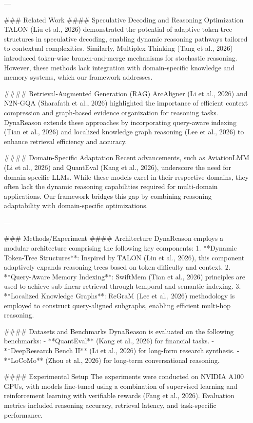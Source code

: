 ---

### Related Work  
#### Speculative Decoding and Reasoning Optimization  
TALON (Liu et al., 2026) demonstrated the potential of adaptive token-tree structures in speculative decoding, enabling dynamic reasoning pathways tailored to contextual complexities. Similarly, Multiplex Thinking (Tang et al., 2026) introduced token-wise branch-and-merge mechanisms for stochastic reasoning. However, these methods lack integration with domain-specific knowledge and memory systems, which our framework addresses.

#### Retrieval-Augmented Generation (RAG)  
ArcAligner (Li et al., 2026) and N2N-GQA (Sharafath et al., 2026) highlighted the importance of efficient context compression and graph-based evidence organization for reasoning tasks. DynaReason extends these approaches by incorporating query-aware indexing (Tian et al., 2026) and localized knowledge graph reasoning (Lee et al., 2026) to enhance retrieval efficiency and accuracy.

#### Domain-Specific Adaptation  
Recent advancements, such as AviationLMM (Li et al., 2026) and QuantEval (Kang et al., 2026), underscore the need for domain-specific LLMs. While these models excel in their respective domains, they often lack the dynamic reasoning capabilities required for multi-domain applications. Our framework bridges this gap by combining reasoning adaptability with domain-specific optimizations.

---

### Methods/Experiment  
#### Architecture  
DynaReason employs a modular architecture comprising the following key components:  
1. **Dynamic Token-Tree Structures**: Inspired by TALON (Liu et al., 2026), this component adaptively expands reasoning trees based on token difficulty and context.  
2. **Query-Aware Memory Indexing**: SwiftMem (Tian et al., 2026) principles are used to achieve sub-linear retrieval through temporal and semantic indexing.  
3. **Localized Knowledge Graphs**: ReGraM (Lee et al., 2026) methodology is employed to construct query-aligned subgraphs, enabling efficient multi-hop reasoning.  

#### Datasets and Benchmarks  
DynaReason is evaluated on the following benchmarks:  
- **QuantEval** (Kang et al., 2026) for financial tasks.  
- **DeepResearch Bench II** (Li et al., 2026) for long-form research synthesis.  
- **LoCoMo** (Zhou et al., 2026) for long-term conversational reasoning.  

#### Experimental Setup  
The experiments were conducted on NVIDIA A100 GPUs, with models fine-tuned using a combination of supervised learning and reinforcement learning with verifiable rewards (Fang et al., 2026). Evaluation metrics included reasoning accuracy, retrieval latency, and task-specific performance.

